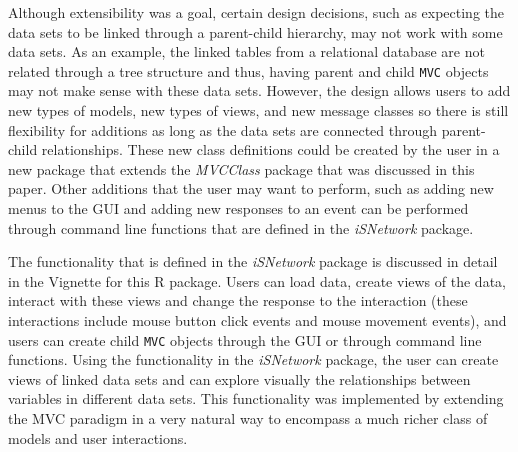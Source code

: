 \documentclass{article}[11pt]
\newcommand{\Robject}[1]{{\texttt{#1}}}
\newcommand{\Rpackage}[1]{{\textit{#1}}}
\begin{document}
Although extensibility was a goal, certain design decisions, such as expecting
the data sets to be linked through a parent-child hierarchy, may not work with
some data sets.  As an example, the linked tables from a relational database
are not related through a tree structure and thus, having parent and child
\Robject{MVC} objects may not make sense with these data sets.  However, the
design allows users to add new types of models, new types of views, and new
message classes so there is still flexibility for additions as long as the
data sets are connected through parent-child relationships.  These new class
definitions could be created by the user in a new package that extends the
\Rpackage{MVCClass} package that was discussed in this paper.  Other additions
that the user may want to perform, such as adding new menus to the GUI and
adding new responses to an event can be performed through command line
functions that are defined in the \Rpackage{iSNetwork} package.

The functionality that is defined in the \Rpackage{iSNetwork} package is
discussed in detail in the Vignette for this R package.  Users can load data,
create views of the data, interact with these views and change the response to
the interaction (these interactions include mouse button click events and
mouse movement events), and users can create child \Robject{MVC} objects
through the GUI or through command line functions.  Using the functionality in
the \Rpackage{iSNetwork} package, the user can create views of linked data sets
and can explore visually the relationships between variables in different data
sets.  This functionality was implemented by extending the MVC paradigm in a
very natural way to encompass a much richer class of models and user
interactions. 
\end{document}
